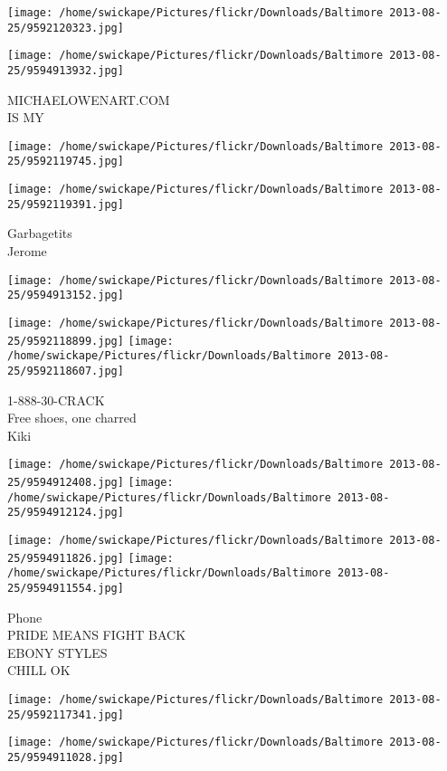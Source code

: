 \documentclass[10pt,letterpaper]{article}
\begin{document}
\texttt{[image: /home/swickape/Pictures/flickr/Downloads/Baltimore 2013-08-25/9592120323.jpg]}

\vspace{0.25in}
\texttt{[image: /home/swickape/Pictures/flickr/Downloads/Baltimore 2013-08-25/9594913932.jpg]}

MICHAELOWENART.COM\\
IS MY
\pagebreak

\texttt{[image: /home/swickape/Pictures/flickr/Downloads/Baltimore 2013-08-25/9592119745.jpg]}

\vspace{0.25in}
\texttt{[image: /home/swickape/Pictures/flickr/Downloads/Baltimore 2013-08-25/9592119391.jpg]}

Garbagetits\\
Jerome
\pagebreak

\texttt{[image: /home/swickape/Pictures/flickr/Downloads/Baltimore 2013-08-25/9594913152.jpg]}

\vspace{0.25in}
\texttt{[image: /home/swickape/Pictures/flickr/Downloads/Baltimore 2013-08-25/9592118899.jpg]}
\texttt{[image: /home/swickape/Pictures/flickr/Downloads/Baltimore 2013-08-25/9592118607.jpg]}

1{-}888{-}30{-}CRACK\\
Free shoes, one charred\\
Kiki
\pagebreak

\texttt{[image: /home/swickape/Pictures/flickr/Downloads/Baltimore 2013-08-25/9594912408.jpg]}
\texttt{[image: /home/swickape/Pictures/flickr/Downloads/Baltimore 2013-08-25/9594912124.jpg]}

\texttt{[image: /home/swickape/Pictures/flickr/Downloads/Baltimore 2013-08-25/9594911826.jpg]}
\texttt{[image: /home/swickape/Pictures/flickr/Downloads/Baltimore 2013-08-25/9594911554.jpg]}

Phone\\
PRIDE MEANS FIGHT BACK\\
EBONY STYLES\\
CHILL OK
\pagebreak

\texttt{[image: /home/swickape/Pictures/flickr/Downloads/Baltimore 2013-08-25/9592117341.jpg]}

\vspace{0.25in}
\texttt{[image: /home/swickape/Pictures/flickr/Downloads/Baltimore 2013-08-25/9594911028.jpg]}
\end{document}

